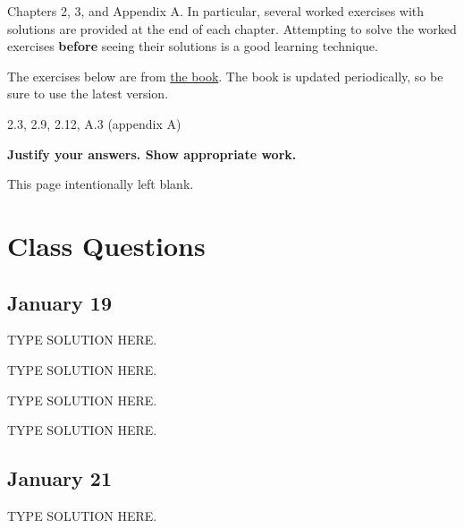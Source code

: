 \documentclass[final]{article}
\begin{document}
\begin{titlepage}
    \begin{tcolorbox}[title=Reading,fonttitle=\bfseries]
        Chapters 2, 3, and Appendix A. In particular, several worked exercises with solutions are provided at the end of each chapter. Attempting to solve the worked exercises \textbf{before} seeing their solutions is a good learning technique.
    \end{tcolorbox}
    The exercises below are from \href{https://sites.google.com/site/gopalpandurangan/home/algorithms-course}{the book}. The book is updated periodically, so be sure to use the latest version.

    \begin{tcolorbox}[title=Exercises,fonttitle=\bfseries]
        2.3, 2.9, 2.12, A.3 (appendix A)
    \end{tcolorbox}

    \textbf{Justify your answers. Show appropriate work.}
\end{titlepage}
\vspace*{\fill}\begin{center}{\Huge This page intentionally left blank.}\end{center}\vspace*{\fill}\thispagestyle{empty}\clearpage
{}

\section{Class Questions}
\subsection{January 19}
\begin{question}
    TYPE SOLUTION HERE.
\end{question}

\begin{question}
    TYPE SOLUTION HERE.
\end{question}

\begin{question}
    TYPE SOLUTION HERE.
\end{question}

\begin{question}
    TYPE SOLUTION HERE.
\end{question}

\subsection{January 21}
\begin{question}
    TYPE SOLUTION HERE.
\end{question}
\end{document}
